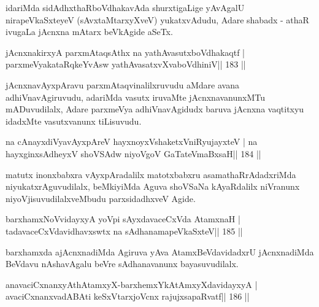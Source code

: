 \begin{artha}
idariMda sidAdhxthaRboVdhakavAda shurxtigaLige yAvAgalU nirapeVkaSxteyeV (sAvxtaMtarxyXveV) yukatxvAdudu, Adare shabadx - athaR ivugaLa jAcnxna mAtarx beVkAgide aSeTx.
\end{artha}

\begin{shl}
jAcnxnakirxyA parxmAtaqsAthx na yathAvasutxboVdhakaqtf |
parxmeVyakataRqkeYvAsw yathAvasatxvXvaboVdhiniV\hfill || 183 ||
\end{shl}

\begin{artha}
jAcnxnavAyxpAravu parxmAtaqvinalilxruvudu aMdare avana adhiVnavAgiruvudu, adariMda vasutx iruvaMte jAcnxnavanunxMTu mADuvudilalx, Adare parxmeVya adhiVnavAgidudx baruva jAcnxna vaqtitxyu idadxMte vasutxvanunx tiLisuvudu.
\end{artha}


\begin{shl}
na cAnayxdiVyavAyxpAreV hayxnoyxV\s shaketxVniRyujayxteV |
na hayxginxsAdheyxV shoVSAdw niyoVgoV GaTateV\s maBxsaH\hfill || 184 ||
\end{shl}

\begin{artha}
matutx inonxbabxra vAyxpAradalilx matotxbabxru asamathaRrAdadxriMda niyukatxrAguvudilalx, beMkiyiMda Aguva shoVSaNa kAyaRdalilx niVranunx niyoVjisuvudilalxveMbudu parxsidadhxveV Agide.
\end{artha}


\begin{shl}
barxhamxNoV\s vidayxyA yoV\s pi sAyxdavaceCxVda AtamxnaH |
tadavaceCxVdavidhavxswtx na sAdhanamapeVkaSxteV\hfill || 185 ||
\end{shl}

\begin{artha}
barxhamxda ajAcnxnadiMda Agiruva yAva AtamxBeVdavidadxrU jAcnxnadiMda BeVdavu nAshavAgalu beVre sAdhanavanunx bayasuvudilalx.
\end{artha}


\begin{shl}
anavaciCxnanxyAthAtamxyX-barxhemxYkAtAmxyXdavidayxyA |
avaciCxnanxvadABAti keSxVtarxjoVcnx rajujxsapaRvatf\hfill || 186 ||
\end{shl}

